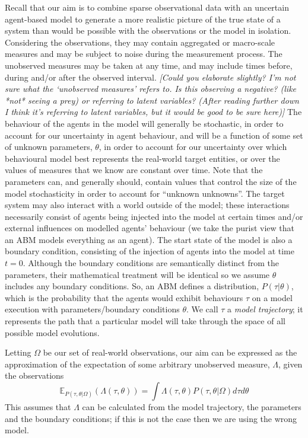 \documentclass{article}
\begin{document}
Recall that our aim is to combine sparse observational data with an uncertain agent-based model to generate a more realistic picture of the true state of a system than would be possible with the observations or the model in isolation. Considering the observations, they may contain aggregated or macro-scale measures and may be subject to noise during the measurement process. The unobserved measures may be taken at any time, and may include times before, during and/or after the observed interval. \textit{[Could you elaborate slightly? I'm not sure what the `unobserved measures' refers to. Is this observing a negative? (like *not* seeing a prey) or referring to latent variables? (After reading further down I think it's referring to latent variables, but it would be good to be sure here)]} The behaviour of the agents in the model will generally be stochastic, in order to account for our uncertainty in agent behaviour, and will be a function of some set of unknown parameters, $\theta$, in order to account for our uncertainty over which behavioural model best represents the real-world target entities, or over the values of measures that we know are constant over time. Note that the parameters can, and generally should, contain values that control the size of the model stochasticity in order to account for ``unknown unknowns''. The target system may also interact with a world outside of the model; these interactions necessarily consist of agents being injected into the model at certain times and/or external influences on modelled agents' behaviour (we take the purist view that an ABM models everything as an agent). The start state of the model is also a boundary condition, consisting of the injection of agents into the model at time $t=0$. Although the boundary conditions are semantically distinct from the parameters, their mathematical treatment will be identical so we assume $\theta$ includes any boundary conditions. So, an ABM defines a distribution, $P(\tau| \theta)$, which is the probability that the agents would exhibit behaviours $\tau$ on a model execution with parameters/boundary conditions $\theta$. We call $\tau$ a \textit{model trajectory}; it represents the path that a particular model will take through the space of all possible model evolutions.

Letting $\Omega$ be our set of real-world observations, our aim can be expressed as the approximation of the expectation of some arbitrary unobserved measure, $\Lambda$, given the observations
\begin{equation}
\mathbb{E}_{P(\tau,\theta|\Omega)}(\Lambda(\tau,\theta)) = \int \Lambda(\tau,\theta) P(\tau,\theta|\Omega) d\tau d\theta
\label{expectation}
\end{equation}
This assumes that $\Lambda$ can be calculated from the model trajectory, the parameters and the boundary conditions; if this is not the case then we are using the wrong model.
\end{document}
